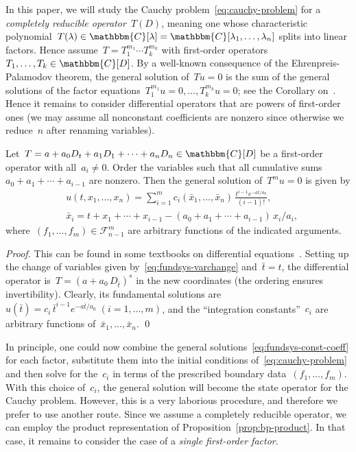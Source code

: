 \documentclass[a4paper]{llncs}
\let\mathbb\mathbbm
\newcommand{\CC}{\mathbb{C}}
\newcommand{\der}{D}
\newcommand{\galg}{\mathcal{F}}
\newcommand{\func}[2]{\galg^{#1}_{#2}}
\newenvironment{myproof}{\begin{proof}}{\qed\end{proof}}
\begin{document}
In this paper, we will study the Cauchy problem~\eqref{eq:cauchy-problem} for a
\emph{completely reducible operator}~$T(D)$, meaning one whose characteristic
polynomial~$T(\lambda) \in \CC[\lambda] = \CC[\lambda_1, \dots, \lambda_n]$
splits into linear factors. Hence assume~$T = T_1^{m_1} \cdots T_k^{m_k}$ with
first-order operators~$T_1, \dots, T_k \in \CC[D]$. By a well-known consequence
of the Ehrenpreis-Palamodov theorem, the general solution of~$Tu=0$ is the sum
of the general solutions of the factor equations~$T_1^{m_1} u = 0, \dots,
T_k^{m_k} u = 0$; see the Corollary on~\cite[p.~187]{Hansen1983}. Hence it
remains to consider differential operators that are powers of first-order ones
(we may assume all nonconstant coefficients are nonzero since otherwise we
reduce~$n$ after renaming variables).

\begin{mylemma}
  \label{lem:power-first-order}
  Let~$T = a + a_0 \der_t + a_1 \der_1 + \cdots + a_n \der_n \in \CC[D]$ be a
  first-order operator with all~$a_i \ne 0$. Order the variables such that all
  cumulative sums~$a_0 + a_1 + \cdots + a_{i-1}$ are nonzero. Then the general
  solution of~$T^m u=0$ is given by
\begin{align}
    \label{eq:fundsys-const-coeff}
    &u(t, x_1, \dots, x_n) = \sum_{i=1}^m c_i(\bar{x}_1, \dots, \bar{x}_n) \,
    \tfrac{t^{i-1} e^{-a t/a_0}}{(i-1)!},\\
    \label{eq:fundsys-varchange}
    & \bar{x}_i = t + x_1 + \cdots + x_{i-1} - (a_0 + a_1 + \cdots +
    a_{i-1}) \, x_i/a_i,
  \end{align}
where~$(f_1, \dots, f_m) \in \func{m}{n-1}$ are arbitrary functions of the
  indicated arguments.
\end{mylemma}
\begin{myproof}
  This can be found in some textbooks on differential
  equations~\cite[p.~139]{Bhamra2010}. Setting up the change of variables given
  by~\eqref{eq:fundsys-varchange} and~$\bar{t} = t$, the differential operator
  is~$T = (a + a_0 \, \der_{\bar{t}})^s$ in the new coordinates (the ordering
  ensures invertibility). Clearly, its fundamental solutions are~$u(\bar{t}) =
  c_i \, \bar{t}^{i-1} e^{-a \bar{t}/a_0} \; (i = 1, \dots, m)$, and the
  ``integration constants''~$c_i$ are arbitrary functions of~$\bar{x}_1, \dots,
  \bar{x}_n$.
\end{myproof}

In principle, one could now combine the general
solutions~\eqref{eq:fundsys-const-coeff} for each factor, substitute them into
the initial conditions of~\eqref{eq:cauchy-problem} and then solve for the~$c_i$
in terms of the prescribed boundary data~$(f_1, \dots, f_m)$. With this choice
of~$c_i$, the general solution will become the state operator for the Cauchy
problem. However, this is a very laborious procedure, and therefore we prefer to
use another route. Since we assume a completely reducible operator, we can
employ the product representation of Proposition~\ref{prop:bp-product}. In that
case, it remains to consider the case of a \emph{single first-order factor}.
\end{document}
